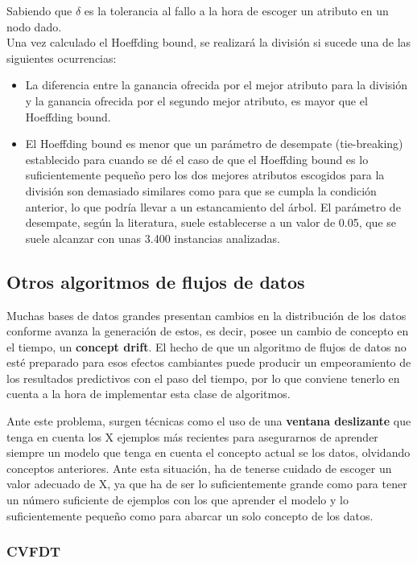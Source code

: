 Sabiendo que $\delta$ es la tolerancia al fallo a la hora de escoger un atributo en un nodo dado\cite{ref10}.\\
Una vez calculado el Hoeffding bound, se realizará la división si sucede una de las siguientes ocurrencias:
\begin{itemize}
	\item La diferencia entre la ganancia ofrecida por el mejor atributo para la división y la ganancia ofrecida por el segundo mejor atributo, es mayor que el Hoeffding bound.
	\item El Hoeffding bound es menor que un parámetro de desempate (tie-breaking) establecido para cuando se dé el caso de que el Hoeffding bound es lo suficientemente pequeño pero los dos mejores atributos escogidos para la división son demasiado similares como para que se cumpla la condición anterior, lo que podría llevar a un estancamiento del árbol. El parámetro de desempate, según la literatura, suele establecerse a un valor de 0.05, que se suele alcanzar con unas 3.400 instancias analizadas.
\end{itemize}

\subsection{Otros algoritmos de flujos de datos}

Muchas bases de datos grandes presentan cambios en la distribución de los datos conforme avanza la generación de estos, es decir, posee un cambio de concepto en el tiempo, un \textbf{concept drift}. El hecho de que un algoritmo de flujos de datos no esté preparado para esos efectos cambiantes puede producir un empeoramiento de los resultados predictivos con el paso del tiempo, por lo que conviene tenerlo en cuenta a la hora de implementar esta clase de algoritmos.

Ante este problema, surgen técnicas como el uso de una \textbf{ventana deslizante} que tenga en cuenta los X ejemplos más recientes para asegurarnos de aprender siempre un modelo que tenga en cuenta el concepto actual se los datos, olvidando conceptos anteriores. Ante esta situación, ha de tenerse cuidado de escoger un valor adecuado de X, ya que ha de ser lo suficientemente grande como para tener un número suficiente de ejemplos con los que aprender el modelo y lo suficientemente pequeño como para abarcar un solo concepto de los datos.

\subsubsection{CVFDT}


